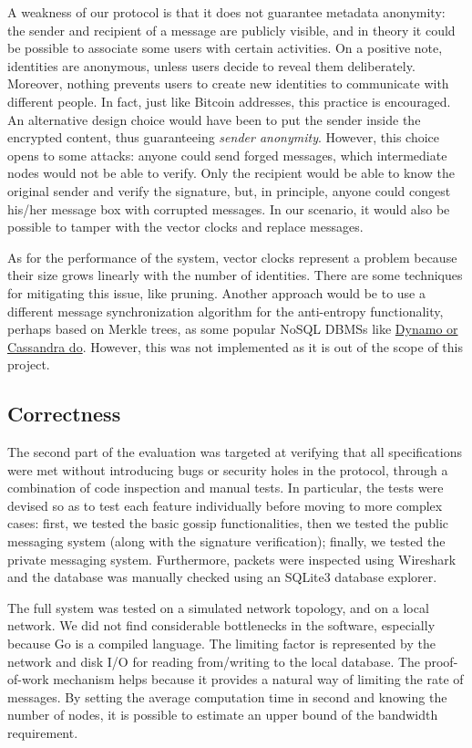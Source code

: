 \documentclass[a4paper,12pt]{article}
\begin{document}
A weakness of our protocol is that it does not guarantee metadata anonymity: the sender and recipient of a message are publicly visible, and in theory it could be possible to associate some users with certain activities. On a positive note, identities are anonymous, unless users decide to reveal them deliberately. Moreover, nothing prevents users to create new identities to communicate with different people. In fact, just like Bitcoin addresses, this practice is encouraged. An alternative design choice would have been to put the sender inside the encrypted content, thus guaranteeing \emph{sender anonymity}. However, this choice opens to some attacks: anyone could send forged messages, which intermediate nodes would not be able to verify. Only the recipient would be able to know the original sender and verify the signature, but, in principle, anyone could congest his/her message box with corrupted messages. In our scenario, it would also be possible to tamper with the vector clocks and replace messages.

As for the performance of the system, vector clocks represent a problem because their size grows linearly with the number of identities. There are some techniques for mitigating this issue, like pruning. Another approach would be to use a different message synchronization algorithm for the anti-entropy functionality, perhaps based on Merkle trees, as some popular NoSQL DBMSs like \href{https://wiki.apache.org/cassandra/AntiEntropy}{Dynamo or Cassandra do}. However, this was not implemented as it is out of the scope of this project.


\subsection*{Correctness}
The second part of the evaluation was targeted at verifying that all specifications were met without introducing bugs or security holes in the protocol, through a combination of code inspection and manual tests. In particular, the tests were devised so as to test each feature individually before moving to more complex cases: first, we tested the basic gossip functionalities, then we tested the public messaging system (along with the signature verification); finally, we tested the private messaging system. Furthermore, packets were inspected using Wireshark and the database was manually checked using an SQLite3 database explorer.

The full system was tested on a simulated network topology, and on a local network. We did not find considerable bottlenecks in the software, especially because Go is a compiled language. The limiting factor is represented by the network and disk I/O for reading from/writing to the local database. The proof-of-work mechanism helps because it provides a natural way of limiting the rate of messages. By setting the average computation time in second and knowing the number of nodes, it is possible to estimate an upper bound of the bandwidth requirement.
\end{document}
